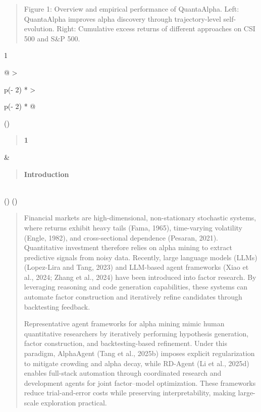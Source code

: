 \documentclass[
]{article}
\begin{document}
\begin{quote}
Figure 1: Overview and empirical performance of QuantaAlpha. Left:
QuantaAlpha improves alpha discovery through trajectory-level
self-evolution. Right: Cumulative excess returns of different approaches
on CSI 500 and S\&P 500.
\end{quote}

1

\begin{longtable}[]{@{}
  >{\raggedright\arraybackslash}p{(\columnwidth - 2\tabcolsep) * }
  >{\raggedright\arraybackslash}p{(\columnwidth - 2\tabcolsep) * }@{}}
\toprule()
\begin{minipage}[b]{\linewidth}\raggedright
\begin{quote}
\textbf{1}
\end{quote}
\end{minipage} & \begin{minipage}[b]{\linewidth}\raggedright
\begin{quote}
\textbf{Introduction}
\end{quote}
\end{minipage} \\
\midrule()
\endhead
\bottomrule()
\end{longtable}

\begin{quote}
Financial markets are high-dimensional, non-stationary stochastic
systems, where returns exhibit heavy tails (Fama, 1965), time-varying
volatility (Engle, 1982), and cross-sectional dependence (Pesaran,
2021). Quantitative investment therefore relies on alpha mining to
extract predictive signals from noisy data. Recently, large language
models (LLMs) (Lopez-Lira and Tang, 2023) and LLM-based agent frameworks
(Xiao et al., 2024; Zhang et al., 2024) have been introduced into factor
research. By leveraging reasoning and code generation capabilities,
these systems can automate factor construction and iteratively refine
candidates through backtesting feedback.

Representative agent frameworks for alpha mining mimic human
quantitative researchers by iteratively performing hypothesis
generation, factor construction, and backtesting-based refinement. Under
this paradigm, AlphaAgent (Tang et al., 2025b) imposes explicit
regularization to mitigate crowding and alpha decay, while RD-Agent (Li
et al., 2025d) enables full-stack automation through coordinated
research and development agents for joint factor--model optimization.
These frameworks reduce trial-and-error costs while preserving
interpretability, making large-scale exploration practical.
\end{quote}
\end{document}
